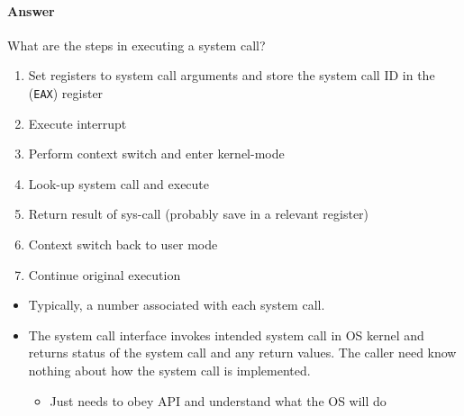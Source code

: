 \paragraph{Answer}
What are the steps in executing a system call?

\begin{enumerate}
  \item Set registers to system call arguments and store the system call ID in the (\texttt{EAX}) register
  \item Execute interrupt
  \item Perform context switch and enter kernel-mode
  \item Look-up system call and execute
  \item Return result of sys-call (probably save in a relevant register)
  \item Context switch back to user mode
  \item Continue original execution
\end{enumerate}

\begin{itemize}
  \item Typically, a number associated with each system call.
  \item The system call interface invokes intended system call in OS kernel and returns status of the system call and any return values.
  The caller need know nothing about how the system call is implemented.
  \begin{itemize}
    \item Just needs to obey API and understand what the OS will do
  \end{itemize}
\end{itemize}
